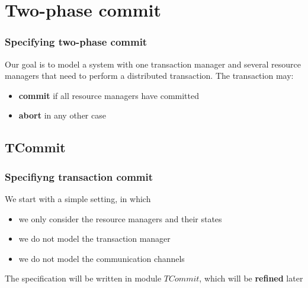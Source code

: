 \section[image=bgphoto_cut]{Two-phase commit}
\begin{frame}[plain]{}
    \sectionpage
\end{frame}

\begin{frame}
    \frametitle{Specifying two-phase commit}

    Our goal is to model a system with one \alert{transaction manager} and
    several \alert{resource managers} that need to perform a distributed
    transaction.
    The transaction may:
    \begin{itemize}
        \item \textbf{commit} if all resource managers have committed
        \item \textbf{abort} in any other case
    \end{itemize}

    \begin{center} 
    \end{center}
\end{frame}

\subsection{TCommit}
\begin{frame}
    \frametitle{Specifiyng transaction commit}
    We start with a simple setting, in which
    \begin{itemize}
        \item we only consider the resource managers and their states
        \item we do not model the transaction manager
        \item we do not model the communication channels
    \end{itemize}
    \pause
    The specification will be written in module $TCommit$, which will be
    \textbf{refined} later

    \begin{center}
        \begin{tlatex}
            \moduleRightDash
        \end{tlatex}
    \end{center}

\end{frame}

